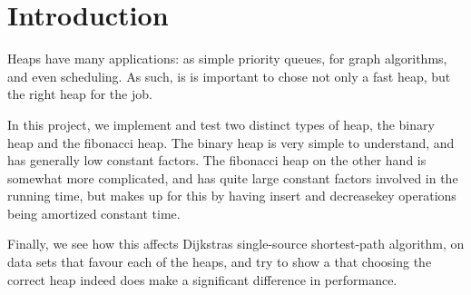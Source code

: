 \section{Introduction}

Heaps have many applications: as simple priority queues, for graph algorithms, and even scheduling. As such, is is important to chose not only a fast heap, but the right heap for the job.

In this project, we implement and test two distinct types of heap, the binary heap and the fibonacci heap. The binary heap is very simple to understand, and has generally low constant factors. The fibonacci heap on the other hand is somewhat more complicated, and has quite large constant factors involved in the running time, but makes up for this by having insert and decreasekey operations being amortized constant time.

Finally, we see how this affects Dijkstras single-source shortest-path algorithm, on data sets that favour each of the heaps, and try to show a that choosing the correct heap indeed does make a significant difference in performance. 